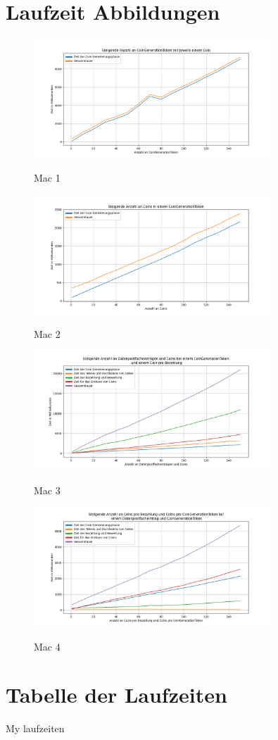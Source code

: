 \documentclass{scrreprt}
\begin{document}
\printbibliography

\appendix 

\chapter{Laufzeit Abbildungen}

\begin{figure}[H]
    \caption{Mac 1}
    \centering
    \includegraphics[width=0.8\textwidth]{figure_mac_1.png}
    \label{fig:mac_1}
\end{figure}
\begin{figure}[H]
    \caption{Mac 2}
    \centering
    \includegraphics[width=0.8\textwidth]{figure_mac_2.png}
    \label{fig:mac_2}
\end{figure}
\begin{figure}[H]
    \caption{Mac 3}
    \centering
    \includegraphics[width=0.8\textwidth]{figure_mac_3.png}
    \label{fig:mac_3}
\end{figure}
\begin{figure}[H]
    \caption{Mac 4}
    \centering
    \includegraphics[width=0.8\textwidth]{figure_mac_4.png}
    \label{fig:mac_4}
\end{figure}

\chapter{Tabelle der Laufzeiten}
My laufzeiten
\end{document}
